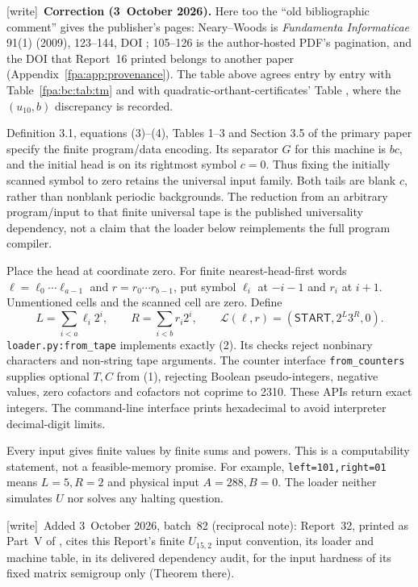 \documentclass[11pt,a4paper]{article}
\numberwithin{equation}{section}
\newcommand{\START}{\mathsf{START}}
\newcommand{\code}[1]{\texttt{\small #1}}
\newcommand{\wtag}{\textup{[write]}}
\begin{document}
\wtag\ \textbf{Correction (3~October 2026).} Here too the ``old bibliographic comment'' gives the publisher's pages: Neary--Woods is \emph{Fundamenta Informaticae} 91(1) (2009), 123--144, DOI ; 105--126 is the author-hosted PDF's pagination, and the DOI  that Report~16 printed belongs to another paper (Appendix~\ref{fpa:app:provenance}). The table above agrees entry by entry with Table~\ref{fpa:bc:tab:tm} and with quadratic-orthant-certificates' Table , where the $(u_{10},b)$ discrepancy is recorded.

Definition 3.1, equations (3)--(4), Tables 1--3 and Section 3.5 of the primary
paper specify the finite program/data encoding. Its separator $G$ for this
machine is $bc$, and the initial head is on its rightmost symbol $c=0$.
Thus fixing the initially scanned symbol to zero retains the universal input
family. Both tails are blank $c$, rather than nonblank periodic backgrounds.
The reduction from an arbitrary program/input to that finite universal tape
is the published universality dependency, not a claim that the loader below
reimplements the full program compiler.

Place the head at coordinate zero. For finite nearest-head-first words
$\ell=\ell_0\cdots\ell_{a-1}$ and $r=r_0\cdots r_{b-1}$, put symbol
$\ell_i$ at $-i-1$ and $r_i$ at $i+1$. Unmentioned cells and the scanned
cell are zero. Define
\[
 L=\sum_{i<a}\ell_i2^i,\qquad R=\sum_{i<b}r_i2^i,
 \qquad \mathcal L(\ell,r)=(\START,2^L3^R,0).             \tag{2}
\]
\code{loader.py:from\_tape} implements exactly (2). Its checks reject
nonbinary characters and non-string tape arguments. The counter interface
\code{from\_counters} supplies optional $T,C$ from (1), rejecting Boolean
pseudo-integers, negative values, zero cofactors and cofactors not coprime to
2310. These APIs return exact integers. The command-line interface prints
hexadecimal to avoid interpreter decimal-digit limits.

Every input gives finite values by finite sums and powers. This is a
computability statement, not a feasible-memory promise. For example,
\code{left=101,right=01} means $L=5,R=2$ and physical input $A=288,B=0$.
The loader neither simulates $U$ nor solves any halting question.

\wtag\ Added 3~October 2026, batch~82 (reciprocal note): Report~32, printed as Part~V of , cites this Report's finite $U_{15,2}$ input convention, its loader and machine table, in its delivered dependency audit, for the input hardness of its fixed matrix semigroup only (Theorem  there).
\end{document}
